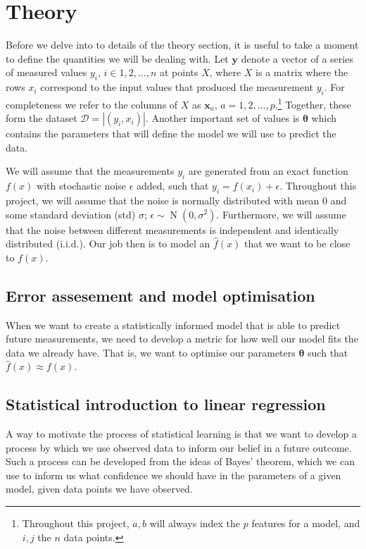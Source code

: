 \documentclass[twocolumn,english,notitlepage]{article}
\renewcommand{\vec}[1]{\boldsymbol{#1}}
\newcommand{\vclosed}[1]{\left|#1\right|}
\begin{document}
\section{Theory}
    Before we delve into to details of the theory section, it is useful to take a moment to define the quantities we will be dealing with. Let $\vec{y}$ denote a vector of a series of measured values $y_i$, $i\in 1, 2,..., n$ at points $X$, where $X$ is a matrix where the rows $x_i$ correspond to the input values that produced the measurement $y_i$. For completeness we refer to the columns of $X$ as $\vec{x}_a$, $a=1, 2,..., p$.\footnote{Throughout this project, $a, b$ will always index the $p$ features for a model, and $i, j$ the $n$ data points.} Together, these form the dataset $\mathcal{D} = \vclosed{(y_i, x_i)}$. Another important set of values is $\vec{\theta}$ which contains the parameters that will define the model we will use to predict the data.

    We will assume that the measurements $y_i$ are generated from an exact function $f(x)$ with stochastic noise $\epsilon$ added, such that $y_i = f(x_i) + \epsilon$. Throughout this project, we will assume that the noise is normally distributed with mean 0 and some standard deviation (std) $\sigma$; $\epsilon \sim \operatorname{N}(0,\sigma^2)$. Furthermore, we will assume that the noise between different measurements is independent and identically distributed (i.i.d.). Our job then is to model an $\hat{f}(x)$ that we want to be close to $f(x)$.

    \subsection{Error assesement and model optimisation}
        When we want to create a statistically informed model that is able to predict future measurements, we need to develop a metric for how well our model fits the data we already have. That is, we want to optimise our parameters $\vec{\theta}$ such that $\hat{f}(x) \approx f(x)$.
   

    \subsection{Statistical introduction to linear regression}
        A way to motivate the process of statistical learning is that we want to develop a process by which we use observed data to inform our belief in a future outcome. Such a process can be developed from the ideas of Bayes' theorem, which we can use to inform us what confidence we should have in the parameters of a given model, given data points we have observed.
        
\end{document}
